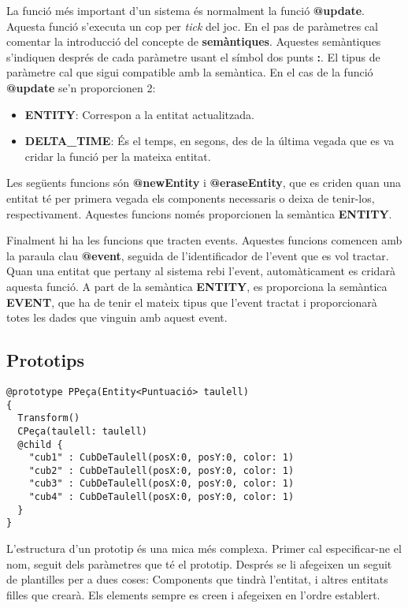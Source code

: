 La funció més important d'un sistema és normalment la funció {\bf @update}. Aquesta funció s'executa un cop per {\em tick} del joc. En el pas de paràmetres cal comentar la introducció del concepte de {\bf semàntiques}. Aquestes semàntiques s'indiquen després de cada paràmetre usant el símbol dos punts {\bf :}. El tipus de paràmetre cal que sigui compatible amb la semàntica. En el cas de la funció {\bf @update} se'n proporcionen 2:

\begin{itemize}
  \item {\bf ENTITY}: Correspon a la entitat actualitzada.
  \item {\bf DELTA\_TIME}: És el temps, en segons, des de la última vegada que es va cridar la funció per la mateixa entitat.
\end{itemize}

Les següents funcions són {\bf @newEntity} i {\bf @eraseEntity}, que es criden quan una entitat té per primera vegada els components necessaris o deixa de tenir-los, respectivament. Aquestes funcions només proporcionen la semàntica {\bf ENTITY}.

Finalment hi ha les funcions que tracten events. Aquestes funcions comencen amb la paraula clau {\bf @event}, seguida de l'identificador de l'event que es vol tractar. Quan una entitat que pertany al sistema rebi l'event, automàticament es cridarà aquesta funció. A part de la semàntica {\bf ENTITY}, es proporciona la semàntica {\bf EVENT}, que ha de tenir el mateix tipus que l'event tractat i proporcionarà totes les dades que vinguin amb aquest event.

\subsection{Prototips}

\begin{verbatim}
@prototype PPeça(Entity<Puntuació> taulell)
{
  Transform()
  CPeça(taulell: taulell)
  @child {
    "cub1" : CubDeTaulell(posX:0, posY:0, color: 1)
    "cub2" : CubDeTaulell(posX:0, posY:0, color: 1)
    "cub3" : CubDeTaulell(posX:0, posY:0, color: 1)
    "cub4" : CubDeTaulell(posX:0, posY:0, color: 1)
  }
}
\end{verbatim}

L'estructura d'un prototip és una mica més complexa. Primer cal especificar-ne el nom, seguit dels paràmetres que té el prototip. Després se li afegeixen un seguit de plantilles per a dues coses: Components que tindrà l'entitat, i altres entitats filles que crearà. Els elements sempre es creen i afegeixen en l'ordre establert.

